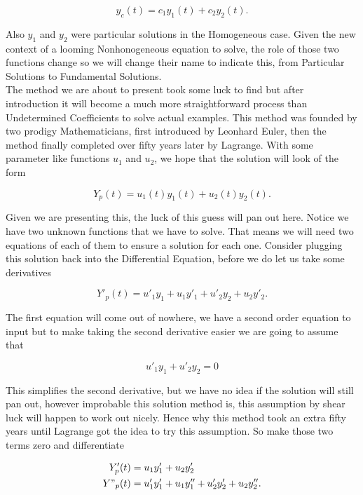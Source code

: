 \documentclass[12pt]{article}
\begin{document}
\begin{equation*}
    y_c(t)=c_1y_1(t)+c_2y_2(t).
\end{equation*}

Also $y_1$ and $y_2$ were particular solutions in the Homogeneous case. Given the new context of a looming Nonhonogeneous equation to solve, the role of those two functions change so we will change their name to indicate this, from Particular Solutions to Fundamental Solutions. \\

The method we are about to present took some luck to find but after introduction it will become a much more straightforward process than Undetermined Coefficients to solve actual examples. This method was founded by two prodigy Mathematicians, first introduced by Leonhard Euler, then the method finally completed over fifty years later by Lagrange. With some parameter like functions $u_1$ and $u_2$, we hope that the solution will look of the form

\begin{equation*}
    Y_p(t)=u_1(t)y_1(t)+u_2(t)y_2(t).
\end{equation*}

Given we are presenting this, the luck of this guess will pan out here. Notice we have two unknown functions that we have to solve. That means we will need two equations of each of them to ensure a solution for each one. Consider plugging this solution back into the Differential Equation, before we do let us take some derivatives

\begin{equation*}
    Y'_p(t) = u'_1y_1+u_1y'_1+u'_2y_2+u_2y'_2.
\end{equation*}

The first equation will come out of nowhere, we have a second order equation to input but to make taking the second derivative easier we are going to assume that 

\begin{equation*}
    u'_1y_1+u'_2y_2=0
\end{equation*}

This simplifies the second derivative, but we have no idea if the solution will still pan out, however improbable this solution method is, this assumption by shear luck will happen to work out nicely. Hence why this method took an extra fifty years until Lagrange got the idea to try this assumption. So make those two terms zero and differentiate

\begin{align*}
    Y'_p(t) &= u_1y'_1+u_2y'_2 \\
    Y"_p(t) &= u'_1y'_1+u_1y''_1+u'_2y'_2+u_2y''_2.
\end{align*}
\end{document}
